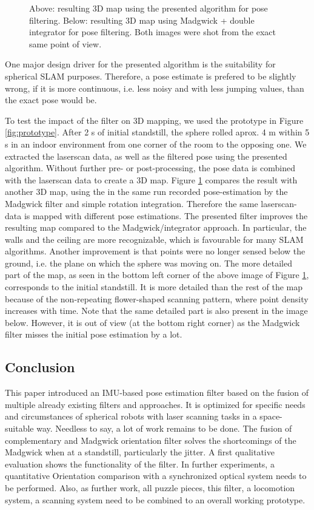 \documentclass[letterpaper, 10 pt, conference]{ieeeconf}  %
\begin{document}
\begin{figure}
\begin{center}
\caption{Above: resulting 3D map using the presented algorithm for pose filtering. Below: resulting 3D map using Madgwick + double integrator for pose filtering. Both images were shot from the exact same point of view. }
\label{fig:mapping}
\end{center}
\end{figure}

One major design driver for the presented algorithm is the suitability for spherical SLAM purposes.
Therefore, a pose estimate is prefered to be slightly wrong, if it is more continuous, i.e. less noisy and with less jumping values, than the exact pose would be.

To test the impact of the filter on 3D mapping, we used the prototype in Figure \ref{fig:prototype}.
After 2 s of initial standstill, the sphere rolled aprox. 4 m within 5 s in an indoor environment from one corner of the room to the opposing one.
We extracted the laserscan data, as well as the filtered pose using the presented algorithm.
Without further pre- or post-processing, the pose data is combined with the laserscan data to create a 3D map.
Figure \ref{fig:mapping} compares the result with another 3D map, using the in the same run recorded pose-estimation by the Madgwick filter and simple rotation integration.
Therefore the same laserscan-data is mapped with different pose estimations.
The presented filter improves the resulting map compared to the Madgwick/integrator approach.
In particular, the walls and the ceiling are more recognizable, which is favourable for many SLAM algorithms.
Another improvement is that points were no longer sensed below the ground, i.e. the plane on which the sphere was moving on.
The more detailed part of the map, as seen in the bottom left corner of the above image of Figure \ref{fig:mapping}, corresponds to the initial standstill.
It is more detailed than the rest of the map because of the non-repeating flower-shaped scanning pattern, where point density increases with time.
Note that the same detailed part is also present in the image below.
However, it is out of view (at the bottom right corner) as the Madgwick filter misses the initial pose estimation by a lot. 


\subsection{Conclusion}
This paper introduced an IMU-based pose estimation filter based on the fusion of multiple already existing filters and approaches.
It is optimized for specific needs and circumstances of spherical robots with laser scanning tasks in a space-suitable way.
Needless to say, a lot of work remains to be done.
The fusion of complementary and Madgwick orientation filter solves the shortcomings of the Madgwick when at a standstill, particularly the jitter.
A first qualitative evaluation shows the functionality of the filter.
In further experiments, a quantitative Orientation comparison with a synchronized optical system needs to be performed.
Also, as further work, all puzzle pieces, this filter, a locomotion system, a scanning system need to be combined to an overall working prototype.
\end{document}
